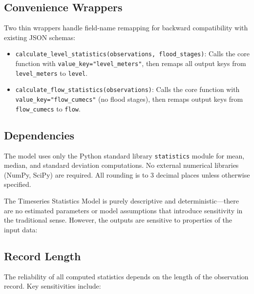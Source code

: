 \documentclass[11pt,a4paper]{article}
\begin{document}
\subsection{Convenience Wrappers}

Two thin wrappers handle field-name remapping for backward compatibility with existing JSON schemas:

\begin{itemize}
    \item \texttt{calculate\_level\_statistics(observations, flood\_stages)}: Calls the core function with \texttt{value\_key="level\_meters"}, then remaps all output keys from \texttt{level\_meters} to \texttt{level}.
    \item \texttt{calculate\_flow\_statistics(observations)}: Calls the core function with \texttt{value\_key="flow\_cumecs"} (no flood stages), then remaps output keys from \texttt{flow\_cumecs} to \texttt{flow}.
\end{itemize}

\subsection{Dependencies}

The model uses only the Python standard library \texttt{statistics} module for mean, median, and standard deviation computations. No external numerical libraries (NumPy, SciPy) are required. All rounding is to 3 decimal places unless otherwise specified.

\clearpage

\mkmsensitivity

The Timeseries Statistics Model is purely descriptive and deterministic---there are no estimated parameters or model assumptions that introduce sensitivity in the traditional sense. However, the outputs are sensitive to properties of the input data:



\subsection{Record Length}

The reliability of all computed statistics depends on the length of the observation record. Key sensitivities include:
\end{document}
